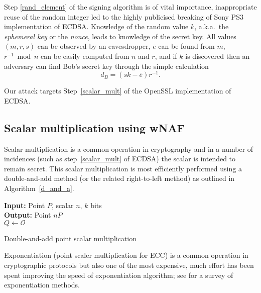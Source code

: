 \documentclass[twocolumn]{article}
\newcommand{\myupcase}[1]{\uppercase{#1}}
\begin{document}
Step \ref{rand_element} of the signing algorithm is of vital importance, inappropriate reuse of the random integer led to the highly publicised breaking of Sony PS3 implementation of \myupcase{ecdsa}. 
Knowledge of the random value $k$, a.k.a.\ the \textit{ephemeral key} or the \textit{nonce}, leads to knowledge of the secret key.
All values $(m,r,s)$ can be observed by an eavesdropper, $\bar{e}$ can be found from $m$, $r^{-1}\bmod n$ can be easily computed from $n$ and $r$, and if $k$ is discovered then an adversary can find Bob's secret key through the simple calculation $$d_B=(sk-\bar{e})r^{-1}.$$

Our attack targets Step~\ref{scalar_mult} of the OpenSSL implementation of \myupcase{ecdsa}.

\subsection{Scalar multiplication using wNAF}\label{sub:wnaf}
Scalar multiplication is a common operation in cryptography and in a number of incidences (such as step~\ref{scalar_mult} of \myupcase{ecdsa}) the scalar is intended to remain secret. This scalar multiplication is most efficiently performed using a double-and-add method (or the related right-to-left method) as outlined in Algorithm~\ref{d_and_a}.\\

\begin{algorithm}[htb]\label{d_and_a}
\SetAlgoLined
{\bf Input:} Point $P$, scalar $n$, $k$ bits\\
{\bf Output:} Point $nP$\\
$Q\gets \mathcal{O}$\\
 \caption{Double-and-add point scalar multiplication}
\end{algorithm}\vspace{-0.5cm}


Exponentiation (point scaler multiplication for \myupcase{ecc}) is a common operation in cryptographic protocols but also one of the most expensive, much effort has been spent improving the speed of exponentiation algorithm; see \cite{gordon98survey} for a survey of exponentiation methods.
\end{document}
